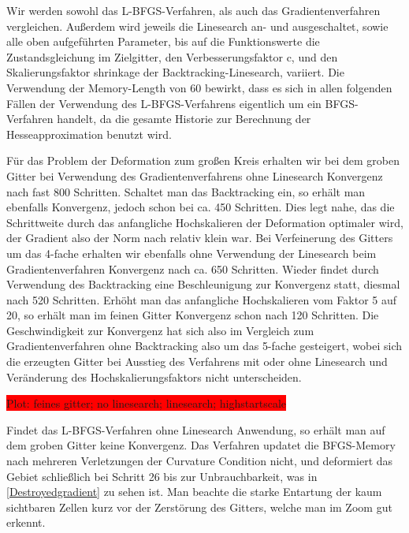 \documentclass[bibliography=totoc,12pt,a4paper]{scrartcl}
\theoremstyle{exampstyle}
\numberwithin{equation}{section}
\begin{document}
Wir werden sowohl das L-BFGS-Verfahren, als auch das Gradientenverfahren vergleichen. Außerdem wird jeweils die Linesearch an- und ausgeschaltet, sowie alle oben aufgeführten Parameter, bis auf die Funktionswerte die Zustandsgleichung im Zielgitter, den Verbesserungsfaktor \textsf{c}, und den Skalierungsfaktor \textsf{shrinkage} der Backtracking-Linesearch, variiert. Die Verwendung der Memory-Length von 60 bewirkt, dass es sich in allen folgenden Fällen der Verwendung des L-BFGS-Verfahrens eigentlich um ein BFGS-Verfahren handelt, da die gesamte Historie zur Berechnung der Hesseapproximation benutzt wird. 


Für das Problem der Deformation zum großen Kreis erhalten wir bei dem groben Gitter 
bei Verwendung des Gradientenverfahrens ohne Linesearch Konvergenz nach fast 800 Schritten. Schaltet man das Backtracking ein, so erhält man ebenfalls Konvergenz, jedoch schon bei ca. 450 Schritten. Dies legt nahe, das die Schrittweite durch das anfangliche Hochskalieren der Deformation optimaler wird, der Gradient also der Norm nach relativ klein war. Bei Verfeinerung des Gitters um das 4-fache erhalten wir ebenfalls ohne Verwendung der Linesearch beim Gradientenverfahren Konvergenz nach ca. 650 Schritten. Wieder findet durch Verwendung des Backtracking eine Beschleunigung zur Konvergenz statt, diesmal nach 520 Schritten. Erhöht man das anfangliche Hochskalieren vom Faktor 5 auf 20, so erhält man im feinen Gitter Konvergenz schon nach 120 Schritten. Die Geschwindigkeit zur Konvergenz hat sich also im Vergleich zum Gradientenverfahren ohne Backtracking also um das 5-fache gesteigert, wobei sich die erzeugten Gitter bei Ausstieg des Verfahrens mit oder ohne Linesearch und Veränderung des Hochskalierungsfaktors nicht unterscheiden. 

\colorbox{red}{Plot: feines gitter; no linesearch; linesearch; highstartscale}

Findet das L-BFGS-Verfahren ohne Linesearch Anwendung, so erhält man auf dem groben Gitter keine Konvergenz. Das Verfahren updatet die BFGS-Memory nach mehreren Verletzungen der Curvature Condition nicht, und deformiert das Gebiet schließlich bei Schritt 26 bis zur Unbrauchbarkeit, was in \ref{Destroyedgradient} zu sehen ist. Man beachte die starke Entartung der kaum sichtbaren Zellen kurz vor der Zerstörung des Gitters, welche man im Zoom gut erkennt.
\end{document}
